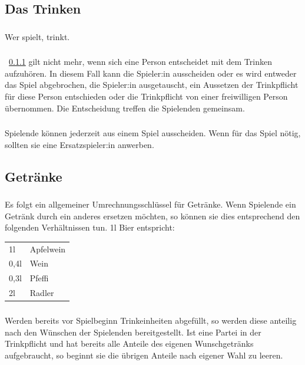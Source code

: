 \subsection{Das Trinken}
\subsubsection{}\label{Allgemeine_Regelungen:Trinken:Trink}
Wer spielt, trinkt.

\subsubsection{}
~\ref{Allgemeine_Regelungen:Trinken:Trink} gilt nicht mehr, wenn sich eine Person entscheidet mit dem Trinken aufzuhören.
In diesem Fall kann die Spieler:in ausscheiden oder es wird entweder das Spiel abgebrochen, die Spieler:in ausgetauscht, ein Aussetzen der Trinkpflicht für diese Person entschieden oder die Trinkpflicht von einer freiwilligen Person übernommen.
Die Entscheidung treffen die Spielenden gemeinsam.

\subsubsection{}
Spielende können jederzeit aus einem Spiel ausscheiden. Wenn für das Spiel nötig, sollten sie eine Ersatzspieler:in anwerben.

\subsection{Getränke}\label{Allgemeine_Regelungen:Getränke}
\subsubsection{}\label{Allgemeine_Regelungen:Getränke:Umrechnung}
Es folgt ein allgemeiner Umrechnungsschlüssel für Getränke.
Wenn Spielende ein Getränk durch ein anderes ersetzen möchten, so können sie dies entsprechend den folgenden Verhältnissen tun.
1l Bier entspricht:

\begin{tabular}{l l}
	1l   & Apfelwein \\
	0,4l & Wein      \\
	0,3l & Pfeffi    \\
	2l   & Radler
\end{tabular}

\subsubsection{}\label{Allgemeine_Regelungen:Getränke:Abfüllen}
Werden bereits vor Spielbeginn Trinkeinheiten abgefüllt, so werden diese anteilig nach den Wünschen der Spielenden bereitgestellt.
Ist eine Partei in der Trinkpflicht und hat bereits alle Anteile des eigenen Wunschgetränks aufgebraucht, so beginnt sie die übrigen Anteile nach eigener Wahl zu leeren.

